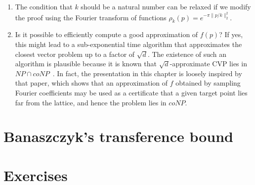 \begin{remark}
  \begin{enumerate}
    \item 
      The condition that $k$ should be a natural number can be relaxed
      if we modify the proof using the Fourier transform of functions
      $\rho_k(p) = e^{-\pi \|p/k\|_2^2}$.

    \item
      Is it possible to efficiently compute a good approximation of $f(p)$?
      If yes, this might lead to a sub-exponential time algorithm that approximates
      the closest vector problem up to a factor of $\sqrt{d}$.
      The existence of such an algorithm is plausible
      because it is known that $\sqrt{d}$-approximate CVP lies in $NP \cap coNP$~\cite{MR2176561}.
      In fact, the presentation in this chapter is loosely inspired by that paper,
      which shows that an approximation of $f$ obtained by sampling Fourier coefficients
      may be used as a certificate that
      a given target point lies far from the lattice, and hence the problem lies in $coNP$.
  \end{enumerate}
\end{remark}








\section{Banaszczyk's transference bound}
\label{sec:transference-bound-banaszczyk}




\section*{Exercises}

